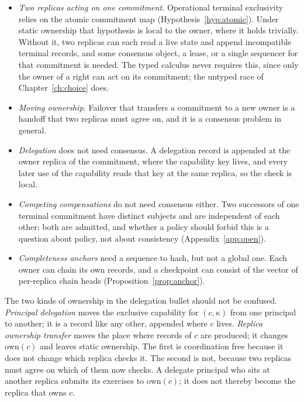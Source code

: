 \documentclass[11pt,openany]{book}
\theoremstyle{remark}
\begin{document}
\begin{itemize}[leftmargin=1.5em]
\item \emph{Two replicas acting on one commitment.} Operational terminal
exclusivity relies on the atomic commitment map
(Hypothesis~\ref{hyp:atomic}). Under static ownership that hypothesis is
local to the owner, where it holds trivially. Without it, two replicas can
each read a live state and append incompatible terminal records, and some
consensus object, a lease, or a single sequencer for that commitment is
needed. The typed calculus never requires this, since only the owner of a
right can act on its commitment; the untyped race of
Chapter~\ref{ch:choice} does.
\item \emph{Moving ownership.} Failover that transfers a commitment to a
new owner is a handoff that two replicas must agree on, and it is a
consensus problem in general.
\item \emph{Delegation} does not need consensus. A delegation record is
appended at the owner replica of the commitment, where the capability key
lives, and every later use of the capability reads that key at the same
replica, so the check is local.
\item \emph{Competing compensations} do not need consensus either. Two
successors of one terminal commitment have distinct subjects and are
independent of each other; both are admitted, and whether a policy should
forbid this is a question about policy, not about consistency
(Appendix~\ref{app:open}).
\item \emph{Completeness anchors} need a sequence to hash, but not a
global one. Each owner can chain its own records, and a checkpoint can
consist of the vector of per-replica chain heads
(Proposition~\ref{prop:anchor}).
\end{itemize}

The two kinds of ownership in the delegation bullet should not be
confused. \emph{Principal delegation} moves the exclusive capability for
$(c,\kappa)$ from one principal to another; it is a record like any other,
appended where $c$ lives. \emph{Replica ownership transfer} moves the
place where records of $c$ are produced; it changes $\mathrm{own}(c)$ and
leaves static ownership. The first is coordination free because it does
not change which replica checks it. The second is not, because two
replicas must agree on which of them now checks. A delegate principal who
sits at another replica submits its exercises to $\mathrm{own}(c)$; it
does not thereby become the replica that owns $c$.
\end{document}
